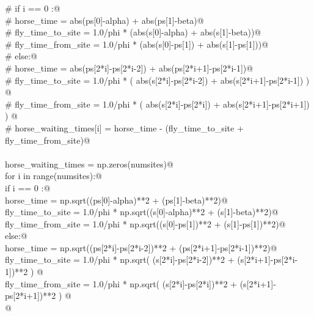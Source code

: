 \documentclass[11.5pt]{report}
\begin{document}
\begin{flushleft}
\begin{list}{}{}
\mbox{}\verb@            #     if i == 0 :@\\
\mbox{}\verb@            #         horse_time         = abs(ps[0]-alpha) + abs(ps[1]-beta)@\\
\mbox{}\verb@            #         fly_time_to_site   = 1.0/phi * (abs(s[0]-alpha) + abs(s[1]-beta))@\\
\mbox{}\verb@            #         fly_time_from_site = 1.0/phi * (abs(s[0]-ps[1]) + abs(s[1]-ps[1]))@\\
\mbox{}\verb@            #     else:@\\
\mbox{}\verb@            #         horse_time         = abs(ps[2*i]-ps[2*i-2]) + abs(ps[2*i+1]-ps[2*i-1])@\\
\mbox{}\verb@            #         fly_time_to_site   = 1.0/phi * ( abs(s[2*i]-ps[2*i-2]) + abs(s[2*i+1]-ps[2*i-1]) ) @\\
\mbox{}\verb@            #         fly_time_from_site = 1.0/phi * ( abs(s[2*i]-ps[2*i])   + abs(s[2*i+1]-ps[2*i+1]) ) @\\
\mbox{}\verb@            #     horse_waiting_times[i] = horse_time - (fly_time_to_site + fly_time_from_site)@\\
\mbox{}\verb@@\\
\mbox{}\verb@            horse_waiting_times = np.zeros(numsites)@\\
\mbox{}\verb@            for i in range(numsites):@\\
\mbox{}\verb@                if i == 0 :@\\
\mbox{}\verb@                    horse_time         = np.sqrt((ps[0]-alpha)**2 + (ps[1]-beta)**2)@\\
\mbox{}\verb@                    fly_time_to_site   = 1.0/phi * np.sqrt((s[0]-alpha)**2 + (s[1]-beta)**2)@\\
\mbox{}\verb@                    fly_time_from_site = 1.0/phi * np.sqrt((s[0]-ps[1])**2 + (s[1]-ps[1])**2)@\\
\mbox{}\verb@                else:@\\
\mbox{}\verb@                    horse_time         = np.sqrt((ps[2*i]-ps[2*i-2])**2 + (ps[2*i+1]-ps[2*i-1])**2)@\\
\mbox{}\verb@                    fly_time_to_site   = 1.0/phi * np.sqrt( (s[2*i]-ps[2*i-2])**2 + (s[2*i+1]-ps[2*i-1])**2 ) @\\
\mbox{}\verb@                    fly_time_from_site = 1.0/phi * np.sqrt( (s[2*i]-ps[2*i])**2   + (s[2*i+1]-ps[2*i+1])**2 ) @\\
\mbox{}\verb@                    @\\

\end{list}
\end{flushleft}
\end{document}
